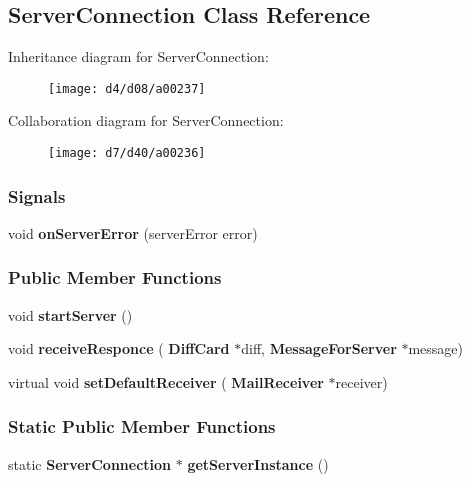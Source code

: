 \subsection{Server\+Connection Class Reference}
\label{a00238}


Inheritance diagram for Server\+Connection\+:
\nopagebreak
\begin{figure}[H]
\begin{center}
\leavevmode
\texttt{[image: d4/d08/a00237]}
\end{center}
\end{figure}


Collaboration diagram for Server\+Connection\+:
\nopagebreak
\begin{figure}[H]
\begin{center}
\leavevmode
\texttt{[image: d7/d40/a00236]}
\end{center}
\end{figure}
\subsubsection*{Signals}
\begin{DoxyCompactItemize}
\item 
\mbox{\label{a00238_ae97f8eaa15a3da8f069ad502e89039ae}} 
void {\bfseries on\+Server\+Error} (server\+Error error)
\end{DoxyCompactItemize}
\subsubsection*{Public Member Functions}
\begin{DoxyCompactItemize}
\item 
\mbox{\label{a00238_a1d45a6a7b2370c82ed2849959bb18c2a}} 
void {\bfseries start\+Server} ()
\item 
\mbox{\label{a00238_a26c5b969c3e5151033673e2bcce5ed4a}} 
void {\bfseries receive\+Responce} (\textbf{ Diff\+Card} $\ast$diff, \textbf{ Message\+For\+Server} $\ast$message)
\item 
\mbox{\label{a00162_aa85db0004c26606c5ac294e5de000b96}} 
virtual void {\bfseries set\+Default\+Receiver} (\textbf{ Mail\+Receiver} $\ast$receiver)
\end{DoxyCompactItemize}
\subsubsection*{Static Public Member Functions}
\begin{DoxyCompactItemize}
\item 
\mbox{\label{a00238_ad64d541093e285a983911f22ab9a0bff}} 
static \textbf{ Server\+Connection} $\ast$ {\bfseries get\+Server\+Instance} ()
\end{DoxyCompactItemize}

